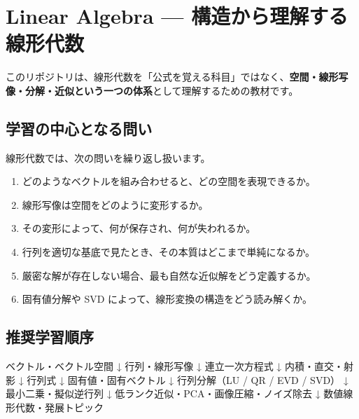\documentclass[
  11pt,
  a4paper,
]{ltjsarticle}
\author{}
\date{}
\newenvironment{Shaded}{}{}
\newcommand{\NormalTok}[1]{#1}
\providecommand{\tightlist}{%
  \setlength{\itemsep}{0pt}\setlength{\parskip}{0pt}}
\begin{document}
\hypertarget{linear-algebra-ux69cbux9020ux304bux3089ux7406ux89e3ux3059ux308bux7ddaux5f62ux4ee3ux6570}{%
\section{Linear Algebra ---
構造から理解する線形代数}\label{linear-algebra-ux69cbux9020ux304bux3089ux7406ux89e3ux3059ux308bux7ddaux5f62ux4ee3ux6570}}

このリポジトリは、線形代数を「公式を覚える科目」ではなく、\textbf{空間・線形写像・分解・近似という一つの体系}として理解するための教材です。

\hypertarget{ux5b66ux7fd2ux306eux4e2dux5fc3ux3068ux306aux308bux554fux3044}{%
\subsection{学習の中心となる問い}\label{ux5b66ux7fd2ux306eux4e2dux5fc3ux3068ux306aux308bux554fux3044}}

線形代数では、次の問いを繰り返し扱います。

\begin{enumerate}
\def\labelenumi{\arabic{enumi}.}
\tightlist
\item
  どのようなベクトルを組み合わせると、どの空間を表現できるか。
\item
  線形写像は空間をどのように変形するか。
\item
  その変形によって、何が保存され、何が失われるか。
\item
  行列を適切な基底で見たとき、その本質はどこまで単純になるか。
\item
  厳密な解が存在しない場合、最も自然な近似解をどう定義するか。
\item
  固有値分解や SVD によって、線形変換の構造をどう読み解くか。
\end{enumerate}

\hypertarget{ux63a8ux5968ux5b66ux7fd2ux9806ux5e8f}{%
\subsection{推奨学習順序}\label{ux63a8ux5968ux5b66ux7fd2ux9806ux5e8f}}

\begin{Shaded}
\begin{Highlighting}[]
\NormalTok{ベクトル・ベクトル空間}
\NormalTok{        ↓}
\NormalTok{行列・線形写像}
\NormalTok{        ↓}
\NormalTok{連立一次方程式}
\NormalTok{        ↓}
\NormalTok{内積・直交・射影}
\NormalTok{        ↓}
\NormalTok{行列式}
\NormalTok{        ↓}
\NormalTok{固有値・固有ベクトル}
\NormalTok{        ↓}
\NormalTok{行列分解（LU / QR / EVD / SVD）}
\NormalTok{        ↓}
\NormalTok{最小二乗・擬似逆行列}
\NormalTok{        ↓}
\NormalTok{低ランク近似・PCA・画像圧縮・ノイズ除去}
\NormalTok{        ↓}
\NormalTok{数値線形代数・発展トピック}
\end{Highlighting}
\end{Shaded}
\end{document}
